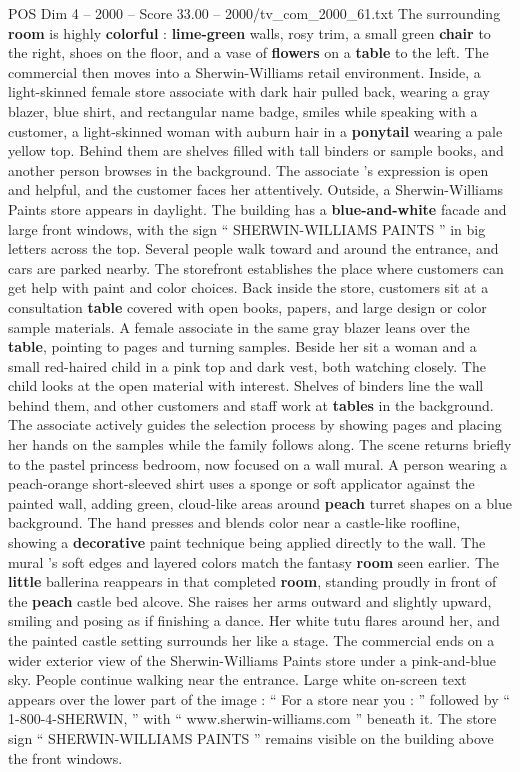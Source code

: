 \begin{textsample}{POS Dim 4 – 2000 – Score 33.00 – 2000/tv\_com\_2000\_61.txt}
The surrounding \textbf{room} is highly \textbf{colorful} : \textbf{lime-green} walls, rosy trim, a small green \textbf{chair} to the right, shoes on the floor, and a vase of \textbf{flowers} on a \textbf{table} to the left.
The commercial then moves into a Sherwin-Williams retail environment.
Inside, a light-skinned female store associate with dark hair pulled back, wearing a gray blazer, blue shirt, and rectangular name badge, smiles while speaking with a customer, a light-skinned woman with auburn hair in a \textbf{ponytail} wearing a pale yellow top.
Behind them are shelves filled with tall binders or sample books, and another person browses in the background.
The associate ’s expression is open and helpful, and the customer faces her attentively.
Outside, a Sherwin-Williams Paints store appears in daylight.
The building has a \textbf{blue-and-white} facade and large front windows, with the sign “ SHERWIN-WILLIAMS PAINTS ” in big letters across the top.
Several people walk toward and around the entrance, and cars are parked nearby.
The storefront establishes the place where customers can get help with paint and color choices.
Back inside the store, customers sit at a consultation \textbf{table} covered with open books, papers, and large design or color sample materials.
A female associate in the same gray blazer leans over the \textbf{table}, pointing to pages and turning samples.
Beside her sit a woman and a small red-haired child in a pink top and dark vest, both watching closely.
The child looks at the open material with interest.
Shelves of binders line the wall behind them, and other customers and staff work at \textbf{tables} in the background.
The associate actively guides the selection process by showing pages and placing her hands on the samples while the family follows along.
The scene returns briefly to the pastel princess bedroom, now focused on a wall mural.
A person wearing a peach-orange short-sleeved shirt uses a sponge or soft applicator against the painted wall, adding green, cloud-like areas around \textbf{peach} turret shapes on a blue background.
The hand presses and blends color near a castle-like roofline, showing a \textbf{decorative} paint technique being applied directly to the wall.
The mural ’s soft edges and layered colors match the fantasy \textbf{room} seen earlier.
The \textbf{little} ballerina reappears in that completed \textbf{room}, standing proudly in front of the \textbf{peach} castle bed alcove.
She raises her arms outward and slightly upward, smiling and posing as if finishing a dance.
Her white tutu flares around her, and the painted castle setting surrounds her like a stage.
The commercial ends on a wider exterior view of the Sherwin-Williams Paints store under a pink-and-blue sky.
People continue walking near the entrance.
Large white on-screen text appears over the lower part of the image : “ For a store near you : ” followed by “ 1-800-4-SHERWIN, ” with “ www.sherwin-williams.com ” beneath it.
The store sign “ SHERWIN-WILLIAMS PAINTS ” remains visible on the building above the front windows.


\end{textsample}
